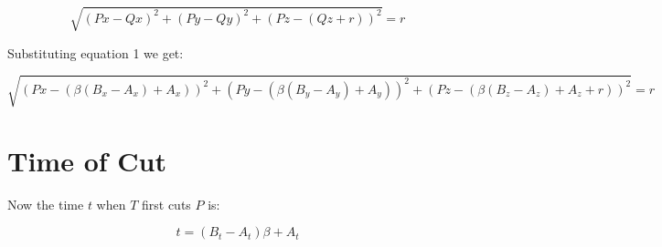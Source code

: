 \documentclass{article}
\begin{document}
\begin{equation}
\sqrt{(Px-Qx)^2 + (Py-Qy)^2 + (Pz-(Qz+r))^2} = r
\end{equation}

Substituting equation 1 we get:

\begin{equation}
\sqrt{
  (Px-(\beta (B_x-A_x)+A_x))^2 +
  (Py-(\beta (B_y-A_y)+A_y))^2 +
  (Pz-(\beta (B_z-A_z)+A_z+r))^2} = r
\end{equation}

\section{Time of Cut}
Now the time $t$ when $T$ first cuts $P$ is:

\begin{equation}
t = (B_t - A_t) \beta + A_t
\end{equation}
\end{document}
